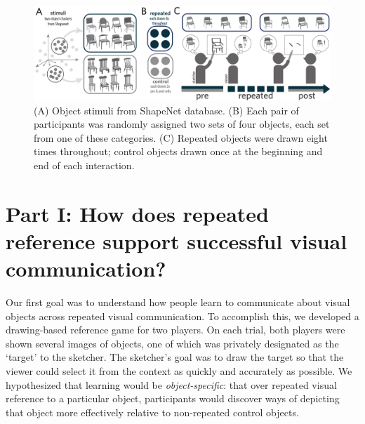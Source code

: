 \documentclass[10pt,letterpaper]{article}
\begin{document}
\begin{figure}
\begin{center}
\includegraphics[width=0.95\linewidth]{figures/task_stimuli.pdf}
\caption{(A) Object stimuli from ShapeNet database. (B) Each pair of participants was randomly assigned two sets of four objects, each set from one of these categories. (C) Repeated objects were drawn eight times throughout; control objects drawn once at the beginning and end of each interaction.}
\label{task_stimuli}
\vspace{-1em}
\end{center}
\end{figure}

\section{Part I: How does repeated reference support successful visual communication?}

Our first goal was to understand how people learn to communicate about visual objects across repeated visual communication. 
To accomplish this, we developed a drawing-based reference game for two players. 
On each trial, both players were shown several images of objects, one of which was privately designated as the `target' to the sketcher. 
The sketcher's goal was to draw the target so that the viewer could select it from the context as quickly and accurately as possible. 
We hypothesized that learning would be \emph{object-specific}: that over repeated visual reference to a particular object, participants would discover ways of depicting that object more effectively relative to non-repeated control objects. 

\end{document}
